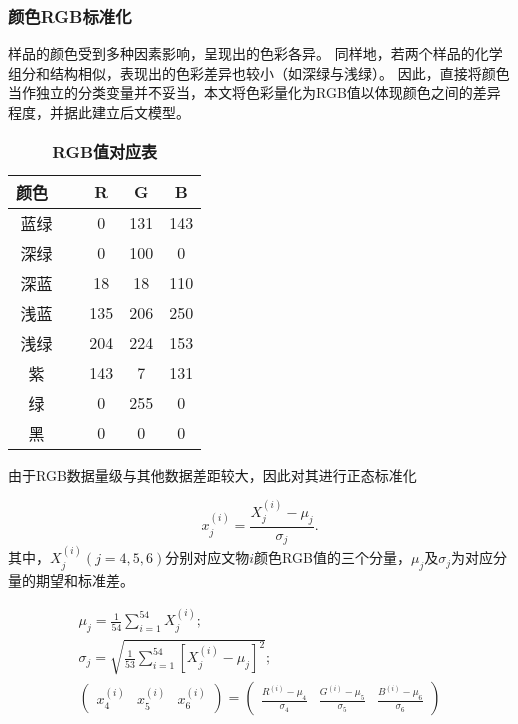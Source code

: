 \subsubsection{颜色RGB标准化} %
\label{ssub:颜色RGB标准化}

样品的颜色受到多种因素影响，呈现出的色彩各异。
同样地，若两个样品的化学组分和结构相似，表现出的色彩差异也较小（如深绿与浅绿）。
因此，直接将颜色当作独立的分类变量并不妥当，本文将色彩量化为RGB值以体现颜色之间的差异程度，并据此建立后文模型。

\begin{table}[!htp]
\caption{\bf RGB值对应表}
\setlength{\tabcolsep}{7mm}
\centering
\begin{tabular}{clccc}
\toprule
颜色~ &  & R   & G   & B    \\
\midrule
蓝绿  &  & 0   & 131 & 143  \\
深绿  &  & 0   & 100 & 0    \\
深蓝  &  & 18  & 18  & 110  \\
浅蓝  &  & 135 & 206 & 250  \\
浅绿  &  & 204 & 224 & 153  \\
紫   &  & 143 & 7   & 131  \\
绿   &  & 0   & 255 & 0    \\
黑   &  & 0   & 0   & 0    \\
\bottomrule
\end{tabular}
\end{table}

由于RGB数据量级与其他数据差距较大，因此对其进行正态标准化

\begin{equation}
	x_{j}^{(i)}=\frac{X_{j}^{(i)}-\mu_{j}}{\sigma_{j}}.
\end{equation}
其中，$X_j^{(i)}(j=4,5,6)$分别对应文物$i$颜色RGB值的三个分量，$\mu_j$及$\sigma_j$为对应分量的期望和标准差。

\begin{equation}
	\begin{array}{c}
\mu_{j}=\frac{1}{54} \sum_{i=1}^{54} X_{j}^{(i)};\\
\sigma_{j}=\sqrt{\frac{1}{53} \sum_{i=1}^{54}\left[X_{j}^{(i)}-\mu_{j}\right]^{2}}; \\
\left(\begin{array}{ccc} x_{4}^{(i)}& x_{5}^{(i)}& x_{6}^{(i)}\end{array}\right)=\left(\begin{array}{ccc}\frac{R^{(i)}-\mu_{4}}{\sigma_{4}}& \frac{G^{(i)}-\mu_{5}}{\sigma_{5}} &\frac{B^{(i)}-\mu_{6}}{\sigma_{6}}\end{array}\right)
\end{array}
\end{equation}

